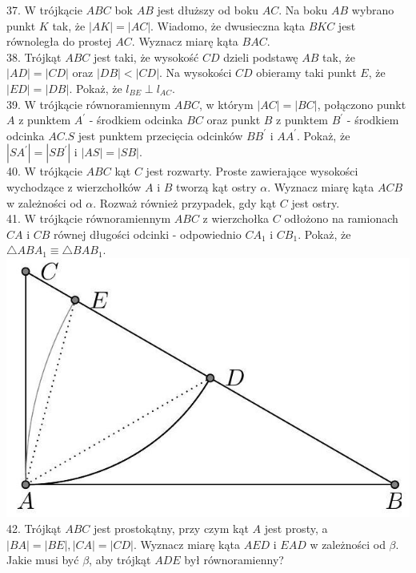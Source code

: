 \documentclass[10pt]{article}
\begin{document}
37. W trójkącie \(A B C\) bok \(A B\) jest dłuższy od boku \(A C\). Na boku \(A B\) wybrano punkt \(K\) tak, że \(|A K|=|A C|\). Wiadomo, że dwusieczna kąta \(B K C\) jest równoległa do prostej \(A C\). Wyznacz miarę kąta \(B A C\).\\
38. Trójkąt \(A B C\) jest taki, że wysokość \(C D\) dzieli podstawę \(A B\) tak, że \(|A D|=|C D|\) oraz \(|D B|<|C D|\). Na wysokości \(C D\) obieramy taki punkt \(E\), że \(|E D|=|D B|\). Pokaż, że \(l_{B E} \perp l_{A C}\).\\
39. W trójkącie równoramiennym \(A B C\), w którym \(|A C|=|B C|\), połączono punkt \(A\) z punktem \(A^{\prime}\) - środkiem odcinka \(B C\) oraz punkt \(B\) z punktem \(B^{\prime}\) - środkiem odcinka \(A C . S\) jest punktem przecięcia odcinków \(B B^{\prime}\) i \(A A^{\prime}\). Pokaż, że \(\left|S A^{\prime}\right|=\left|S B^{\prime}\right|\) i \(|A S|=|S B|\).\\
40. W trójkącie \(A B C\) kąt \(C\) jest rozwarty. Proste zawierające wysokości wychodzące z wierzchołków \(A\) i \(B\) tworzą kąt ostry \(\alpha\). Wyznacz miarę kąta \(A C B\) w zależności od \(\alpha\). Rozważ również przypadek, gdy kąt \(C\) jest ostry.\\
41. W trójkącie równoramiennym \(A B C\) z wierzchołka \(C\) odłożono na ramionach \(C A\) i \(C B\) równej długości odcinki - odpowiednio \(C A_{1}\) i \(C B_{1}\). Pokaż, że \(\triangle A B A_{1} \equiv \triangle B A B_{1}\).\\
\includegraphics[max width=\textwidth, center]{2024_11_21_71f62bd117d375398909g-176}\\
42. Trójkąt \(A B C\) jest prostokątny, przy czym kąt \(A\) jest prosty, a \(|B A|=|B E|,|C A|=|C D|\). Wyznacz miarę kąta \(A E D\) i \(E A D\) w zależności od \(\beta\). Jakie musi być \(\beta\), aby trójkąt \(A D E\) był równoramienny?
\end{document}
